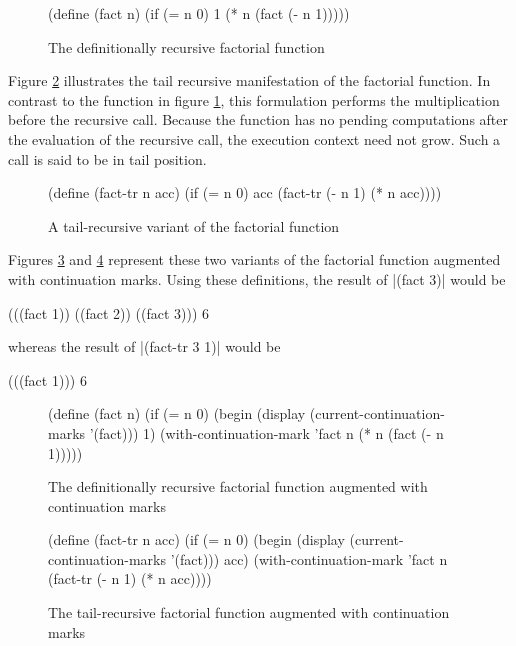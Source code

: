 \documentclass[ms,electronic,twosidetoc,letterpaper,chaptercenter,parttop]{byumsphd}
\begin{document}
\begin{figure}
\begin{schemedisplay}
(define (fact n)
  (if (= n 0)
      1
      (* n (fact (- n 1)))))
\end{schemedisplay}
\caption{The definitionally recursive factorial function}
\label{fac-rec}
\end{figure}

Figure \ref{fac-tail-rec} illustrates the tail recursive manifestation of the factorial
function. In contrast to the function in figure \ref{fac-rec}, this formulation performs
the multiplication before the recursive call. Because the function has no pending
computations after the evaluation of the recursive call, the execution context need not
grow. Such a call is said to be in tail position.

\begin{figure}
\begin{schemedisplay}
(define (fact-tr n acc)
  (if (= n 0)
      acc
      (fact-tr (- n 1) (* n acc))))
\end{schemedisplay}
\caption{A tail-recursive variant of the factorial function}
\label{fac-tail-rec}
\end{figure}

Figures \ref{fac-rec-cm} and \ref{fac-tail-rec-cm} represent these two variants of the
factorial function augmented with continuation marks. Using these definitions, the 
result of \scheme|(fact 3)| would be

\begin{schemedisplay}
(((fact 1)) ((fact 2)) ((fact 3)))
6
\end{schemedisplay}

whereas the result of \scheme|(fact-tr 3 1)| would be

\begin{schemedisplay}
(((fact 1)))
6
\end{schemedisplay}

\begin{figure}
\begin{schemedisplay}
(define (fact n)
  (if (= n 0)
      (begin
        (display (current-continuation-marks '(fact)))
        1)
      (with-continuation-mark 'fact n (* n (fact (- n 1)))))
\end{schemedisplay}
\caption{The definitionally recursive factorial function augmented with continuation marks}
\label{fac-rec-cm}
\end{figure}

\begin{figure}
\begin{schemedisplay}
(define (fact-tr n acc)
  (if (= n 0)
      (begin
        (display (current-continuation-marks '(fact)))
        acc)
      (with-continuation-mark 'fact n (fact-tr (- n 1) (* n acc))))
\end{schemedisplay}
\caption{The tail-recursive factorial function augmented with continuation marks}
\label{fac-tail-rec-cm}
\end{figure}
\end{document}
